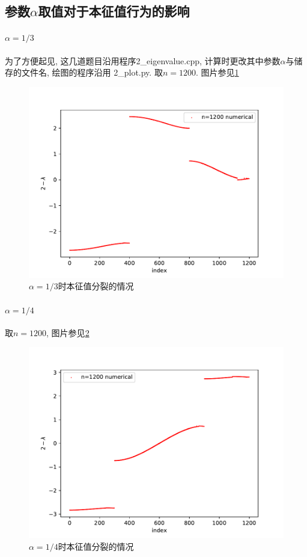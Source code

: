 \documentclass[a4paper,zihao=5,UTF8]{ctexart}
\begin{document}
	\subsection{参数$\alpha$取值对于本征值行为的影响}
	\paragraph{$\alpha = 1 / 3$}
	为了方便起见, 这几道题目沿用程序2\_eigenvalue.cpp, 计算时更改其中参数$\alpha$与储存的文件名, 绘图的程序沿用
	2\_plot.py. 取$n=1200$. 图片参见\ref{alpha 1 3}
	\begin{figure}[htbp]
		\centering
		\includegraphics[scale=0.6]{4_alpha_1_3.pdf}
		\caption{$\alpha=1/3$时本征值分裂的情况}
		\label{alpha 1 3}
	\end{figure}
	\paragraph{$\alpha = 1/4$}取$n=1200$, 图片参见\ref{alpha 1 4}
	\begin{figure}[htbp]
		\centering
		\includegraphics[scale=0.6]{4_alpha_1_4.pdf}
		\caption{$\alpha=1/4$时本征值分裂的情况}
		\label{alpha 1 4}
	\end{figure}
\end{document}

